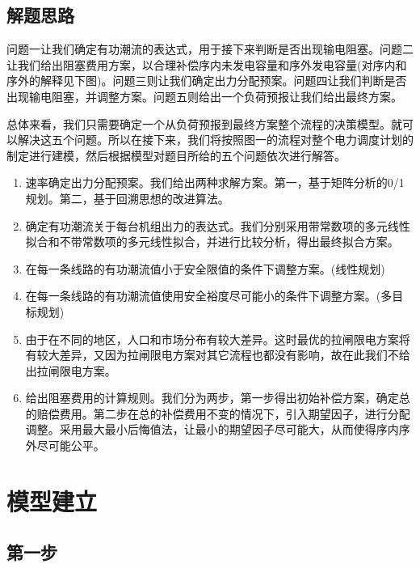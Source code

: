 \documentclass[12pt,a4paper]{ctexart}
\begin{document}
	
	\subsection{解题思路}
	问题一让我们确定有功潮流的表达式，用于接下来判断是否出现输电阻塞。问题二让我们给出阻塞费用方案，以合理补偿序内未发电容量和序外发电容量(对序内和序外的解释见下图)。问题三则让我们确定出力分配预案。问题四让我们判断是否出现输电阻塞，并调整方案。问题五则给出一个负荷预报让我们给出最终方案。
	
	总体来看，我们只需要确定一个从负荷预报到最终方案整个流程的决策模型。就可以解决这五个问题。所以在接下来，我们将按照图一的流程对整个电力调度计划的制定进行建模，然后根据模型对题目所给的五个问题依次进行解答。

\begin{enumerate}[第1步]\vspace{0.5em}
	\item 速率确定出力分配预案。我们给出两种求解方案。第一，基于矩阵分析的0/1规划。第二，基于回溯思想的改进算法。
	
	\item 确定有功潮流关于每台机组出力的表达式。我们分别采用带常数项的多元线性拟合和不带常数项的多元线性拟合，并进行比较分析，得出最终拟合方案。
	
	\item 在每一条线路的有功潮流值小于安全限值的条件下调整方案。(线性规划)

	\item 在每一条线路的有功潮流值使用安全裕度尽可能小的条件下调整方案。(多目标规划)

	\item 由于在不同的地区，人口和市场分布有较大差异。这时最优的拉闸限电方案将有较大差异，又因为拉闸限电方案对其它流程也都没有影响，故在此我们不给出拉闸限电方案。

	\item 给出阻塞费用的计算规则。我们分为两步，第一步得出初始补偿方案，确定总的赔偿费用。第二步在总的补偿费用不变的情况下，引入期望因子，进行分配调整。采用最大最小后悔值法，让最小的期望因子尽可能大，从而使得序内序外尽可能公平。
\end{enumerate}
	
		
\section{模型建立}
	
	\subsection{第一步}
\end{document}
